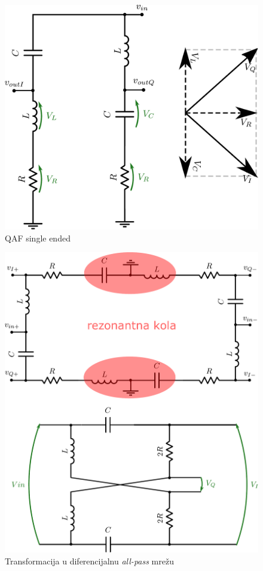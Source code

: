 \documentclass[journal,twocolumn,letterpaper]{IEEEJERM}
\begin{document}
\begin{figure}[!htbp]
  \centering
  \includegraphics[width=0.8\linewidth]{qaf_single_ended.pdf}
  \caption{QAF single ended}
  \label{fig:qaf_single_ended}
\end{figure}


\begin{figure}[!htbp]
  \centering
  \includegraphics[width=\linewidth]{qaf_diff.pdf}
  \caption{Transformacija u diferencijalnu \textit{all-pass} mrežu}
  \label{fig:qaf_diff}
\end{figure}
\end{document}
